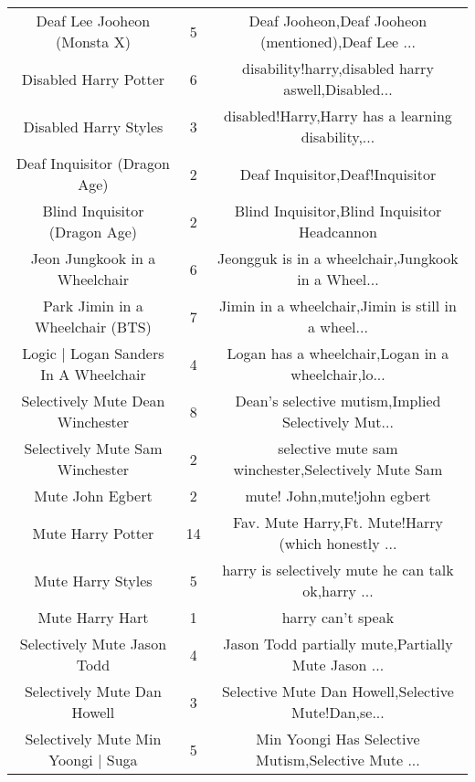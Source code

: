 \begin{table}[h!]
{\begin{tabular}{|c|c|c|}
                       Deaf Lee Jooheon (Monsta X) &      5 & Deaf Jooheon,Deaf Jooheon (mentioned),Deaf Lee ... \\
                             Disabled Harry Potter &      6 & disability!harry,disabled harry aswell,Disabled... \\
                             Disabled Harry Styles &      3 & disabled!Harry,Harry has a learning disability,... \\
                      Deaf Inquisitor (Dragon Age) &      2 &                    Deaf Inquisitor,Deaf!Inquisitor \\
                     Blind Inquisitor (Dragon Age) &      2 &       Blind Inquisitor,Blind Inquisitor Headcannon \\
                     Jeon Jungkook in a Wheelchair &      6 & Jeongguk is in a wheelchair,Jungkook in a Wheel... \\
                  Park Jimin in a Wheelchair (BTS) &      7 & Jimin in a wheelchair,Jimin is still in a wheel... \\
             Logic | Logan Sanders In A Wheelchair &      4 & Logan has a wheelchair,Logan in a wheelchair,lo... \\
                  Selectively Mute Dean Winchester &      8 & Dean's selective mutism,Implied Selectively Mut... \\
                   Selectively Mute Sam Winchester &      2 & selective mute sam winchester,Selectively Mute Sam \\
                                  Mute John Egbert &      2 &                        mute! John,mute!john egbert \\
                                 Mute Harry Potter &     14 & Fav. Mute Harry,Ft. Mute!Harry (which honestly ... \\
                                 Mute Harry Styles &      5 & harry is selectively mute he can talk ok,harry ... \\
                                   Mute Harry Hart &      1 &                                  harry can't speak \\
                       Selectively Mute Jason Todd &      4 & Jason Todd partially mute,Partially Mute Jason ... \\
                       Selectively Mute Dan Howell &      3 & Selective Mute Dan Howell,Selective Mute!Dan,se... \\
                Selectively Mute Min Yoongi | Suga &      5 & Min Yoongi Has Selective Mutism,Selective Mute ... \\

\end{tabular}}
\end{table}
